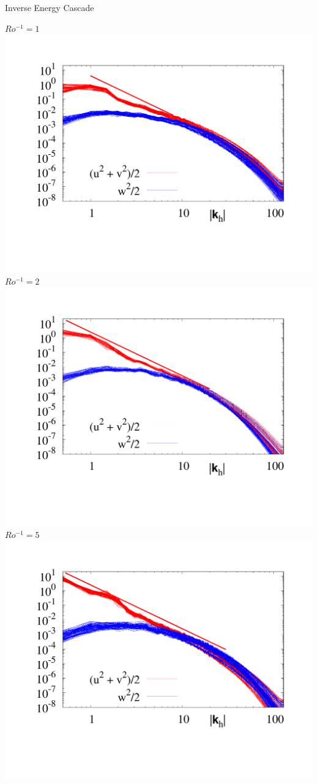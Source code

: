 \documentclass{beamer}
\begin{document}
\begin{frame}{Inverse Energy Cascade}

        \centering
        $Ro^{-1} = 1$
        \includegraphics[width=\textwidth]{images/Om1Spec.pdf}
    \emp
        \centering
        $Ro^{-1} = 2$
        \includegraphics[width=\textwidth]{images/Om2Spec.pdf}
    \emp
        \centering
        $Ro^{-1} = 5$
        \includegraphics[width=\textwidth]{images/Om5Spec.pdf}

\end{frame}
\end{document}
